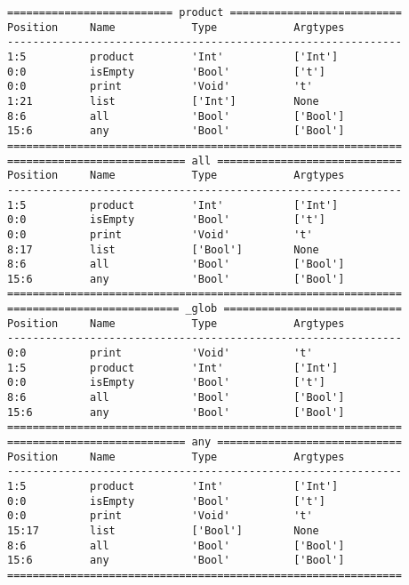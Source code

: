 \documentclass[a4paper]{article}
\begin{document}
\begin{verbatim}
========================== product ===========================
Position     Name            Type            Argtypes            
--------------------------------------------------------------
1:5          product         'Int'           ['Int']             
0:0          isEmpty         'Bool'          ['t']               
0:0          print           'Void'          't'                 
1:21         list            ['Int']         None                
8:6          all             'Bool'          ['Bool']            
15:6         any             'Bool'          ['Bool']            
==============================================================
============================ all =============================
Position     Name            Type            Argtypes            
--------------------------------------------------------------
1:5          product         'Int'           ['Int']             
0:0          isEmpty         'Bool'          ['t']               
0:0          print           'Void'          't'                 
8:17         list            ['Bool']        None                
8:6          all             'Bool'          ['Bool']            
15:6         any             'Bool'          ['Bool']            
==============================================================
=========================== _glob ============================
Position     Name            Type            Argtypes            
--------------------------------------------------------------
0:0          print           'Void'          't'                 
1:5          product         'Int'           ['Int']             
0:0          isEmpty         'Bool'          ['t']               
8:6          all             'Bool'          ['Bool']            
15:6         any             'Bool'          ['Bool']            
==============================================================
============================ any =============================
Position     Name            Type            Argtypes            
--------------------------------------------------------------
1:5          product         'Int'           ['Int']             
0:0          isEmpty         'Bool'          ['t']               
0:0          print           'Void'          't'                 
15:17        list            ['Bool']        None                
8:6          all             'Bool'          ['Bool']            
15:6         any             'Bool'          ['Bool']            
==============================================================


\end{verbatim}
\end{document}
